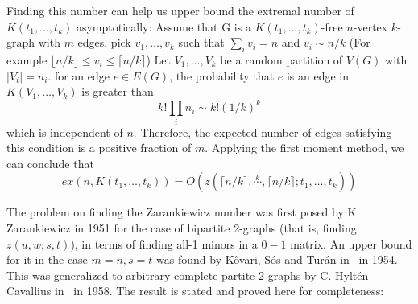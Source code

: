\begin{remark}\label{rem:zar_vs_turan}
    Finding this number can help us upper bound the extremal number of $K(t_1, \dots, t_k)$ asymptotically:
    Assume that G is a $K(t_1, \dots, t_k)$-free $n$-vertex $k$-graph with $m$ edges.
    pick $v_1, \dots, v_k$ such that $\sum_{i} v_i = n $ and $v_i \sim n/k $
    (For example $\lfloor n/k \rfloor \leq v_i \leq \lceil n/k \rceil$)
    Let $V_1, \dots, V_k$ be a random partition of $V(G)$ with $|V_i| = n_i$.
    for an edge $e \in E(G)$, the probability that $e$ is an edge in $K(V_1, \dots, V_k)$ is
    greater than
    \[k! \prod_i n_i \sim k! (1/k)^k\]
    which is independent of $n$.
    Therefore, the expected number of edges satisfying this condition is a positive fraction of $m$.
    Applying the first moment method, we can conclude that
    \[ex(n, K(t_1, \dots, t_k)) = O(z(\lceil n / k \rceil , \overset{k}{\cdots}, \lceil n / k \rceil; t_1, \dots, t_k))\]

\end{remark}


The problem on finding the Zarankiewicz number was first posed by K. Zarankiewicz in 1951 for the
case of bipartite 2-graphs (that is, finding $z(u, w; s, t)$),
in terms of finding all-1 minors in a $0-1$ matrix.
An upper bound for it in the case $m=n, s=t$ was found by Kővari, Sós and Turán in~\cite{Kovari1954} in 1954.
This was generalized to arbitrary complete
partite 2-graphs by C. Hyltén-Cavallius in~\cite{Hylten1958}
in 1958.
The result is stated and proved here for completeness:

